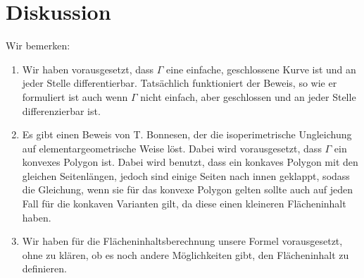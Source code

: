 \documentclass[12pt,a4paper]{article}
\theoremstyle{plain}
\numberwithin{equation}{section}
\begin{document}
\section{Diskussion}
Wir bemerken:
\begin{enumerate}
\item Wir haben vorausgesetzt, dass $\Gamma$ eine einfache, geschlossene Kurve ist und an jeder Stelle differentierbar. Tatsächlich funktioniert der Beweis, so wie er formuliert ist auch wenn $\Gamma$ nicht einfach, aber geschlossen und an jeder Stelle differenzierbar ist.
\item Es gibt einen Beweis von T. Bonnesen, der die isoperimetrische Ungleichung auf elementargeometrische Weise löst. Dabei wird vorausgesetzt, dass $\Gamma$ ein konvexes Polygon ist. Dabei wird benutzt, dass ein konkaves Polygon mit den gleichen Seitenlängen, jedoch sind einige Seiten \glqq nach innen geklappt\grqq, sodass die Gleichung, wenn sie für das konvexe Polygon gelten sollte auch auf jeden Fall für die konkaven Varianten gilt, da diese einen kleineren Flächeninhalt haben.
\item Wir haben für die Flächeninhaltsberechnung unsere Formel vorausgesetzt, ohne zu klären, ob es noch andere Möglichkeiten gibt, den Flächeninhalt zu definieren.
\end{enumerate}
\end{document}
